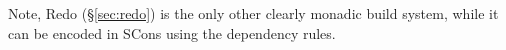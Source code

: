Note, Redo (\S\ref{sec:redo}) is the only other clearly monadic build
system, while it can be encoded in SCons using the dependency rules.

% 
% 
% 
% 
% 
% 


